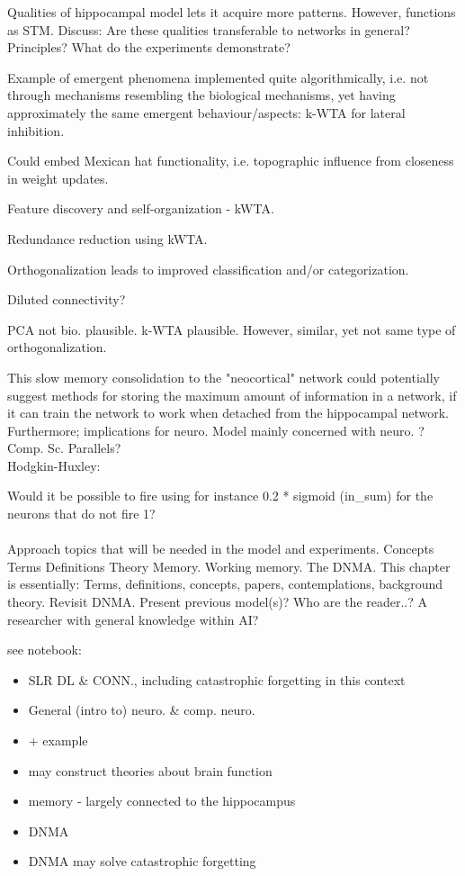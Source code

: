 Qualities of hippocampal model lets it acquire more patterns. However, functions as STM. Discuss: Are these qualities transferable to networks in general? Principles? What do the experiments demonstrate?

Example of emergent phenomena implemented quite algorithmically, i.e. not through mechanisms resembling the biological mechanisms, yet having approximately the same emergent behaviour/aspects: k-WTA for lateral inhibition.

Could embed Mexican hat functionality, i.e. topographic influence from closeness in weight updates.

Feature discovery and self-organization - kWTA.

Redundance reduction using kWTA.

Orthogonalization leads to improved classification and/or categorization.

Diluted connectivity?

PCA not bio. plausible. k-WTA plausible. However, similar, yet not same type of orthogonalization.

This slow memory consolidation to the "neocortical" network could potentially suggest methods for storing the maximum amount of information in a network, if it can train the network to work when detached from the hippocampal network.
\\
Furthermore; implications for neuro. Model mainly concerned with neuro. ? Comp. Sc. Parallels?
\\

Hodgkin-Huxley:

Would it be possible to fire using for instance 0.2 * sigmoid (in\_sum) for the neurons that do not fire 1?
\\\\

Approach topics that will be needed in the model and experiments.
Concepts
Terms
Definitions
Theory
Memory. Working memory.
The DNMA.
This chapter is essentially: Terms, definitions, concepts, papers, contemplations, background theory. Revisit DNMA.
Present previous model(s)?
Who are the reader..? A researcher with general knowledge within AI?

see notebook:

\begin{itemize}
    \item SLR DL \& CONN., including catastrophic forgetting in this context
    \item General (intro to) neuro. \& comp. neuro.
    \item + example
    \item may construct theories about brain function
    \item memory - largely connected to the hippocampus
    \item DNMA
    \item DNMA may solve catastrophic forgetting
\end{itemize}


\cleardoublepage
